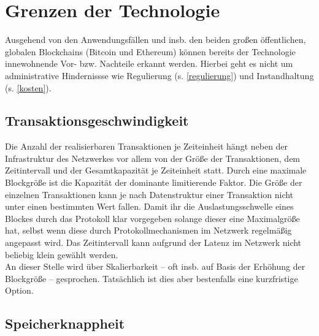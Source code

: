 








\section{Grenzen der Technologie}\label{grenzen-der-technologie}
%

Ausgehend von den Anwendungsfällen und insb. den beiden großen öffentlichen, globalen Blockchains (Bitcoin und Ethereum)  können
bereits der Technologie innewohnende Vor- bzw. Nachteile erkannt werden.
Hierbei geht es nicht um administrative Hindernissse wie Regulierung\label{first:regulierung} (s. \ref{regulierung}) und Instandhaltung\label{first:kosten} (s. \ref{kosten}).

\subsection{Transaktionsgeschwindigkeit}%

Die Anzahl der realisierbaren Transaktionen je Zeiteinheit hängt neben der Infrastruktur des Netzwerkes vor allem von der Größe der Transaktionen, dem Zeitintervall und der Gesamtkapazität je Zeiteinheit statt. Durch eine maximale Blockgröße ist die Kapazität der dominante limitierende Faktor. Die Größe der einzelnen Transaktionen kann je nach Datenstruktur einer Transaktion nicht unter einen bestimmten Wert fallen. Damit ihr die Auslastungsschwelle eines Blockes durch das Protokoll klar vorgegeben solange dieser eine Maximalgröße hat, selbst wenn diese durch Protokollmechanismen im Netzwerk regelmäßig angepasst wird. Das Zeitintervall kann aufgrund der Latenz im Netzwerk nicht beliebig klein gewählt werden. \\
An dieser Stelle wird über Skalierbarkeit -- oft insb. auf Basis der Erhöhung der Blockgröße -- gesprochen. Tatsächlich ist dies aber bestenfalls eine kurzfristige Option. 

\subsection{Speicherknappheit}%

